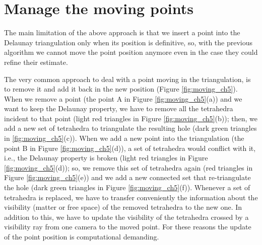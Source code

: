 \section{Manage the moving points}

The main limitation of the above approach is that we insert a point into the Delaunay triangulation only when its position is definitive, so, with the previous algorithm we cannot move the point position anymore even in the case they could refine their estimate. 

The very common approach to deal with a point moving in the triangulation, is to remove it and add it back in the new position \cite{cgal} (Figure \ref{fig:moving_ch5}). 
When we remove a point (the point A in Figure \ref{fig:moving_ch5}(a)) and we want to keep the Delaunay property, we have to remove all the tetrahedra incident to that point (light red triangles in Figure \ref{fig:moving_ch5}(b)); then, we add a new set of tetrahedra to triangulate the resulting hole (dark green triangles in \ref{fig:moving_ch5}(c)).
When we add a new point into the triangulation  (the point B in Figure \ref{fig:moving_ch5}(d)), a set of tetrahedra would conflict with it, i.e., the Delaunay property is broken (light red triangles in Figure \ref{fig:moving_ch5}(d)); so, we remove this set of tetrahedra again (red triangles in Figure \ref{fig:moving_ch5}(e)) and we add a new connected set that re-triangulate the hole (dark green triangles in Figure \ref{fig:moving_ch5}(f)).
Whenever a set of tetrahedra is replaced, we have to transfer conveniently the information about the visibility (matter or free space) of the removed tetrahedra to the new one. 
In addition to this, we have to update the visibility of the tetrahedra crossed by a visibility ray from one camera to the moved point.
For these reasons the update of the point position is computational demanding.

